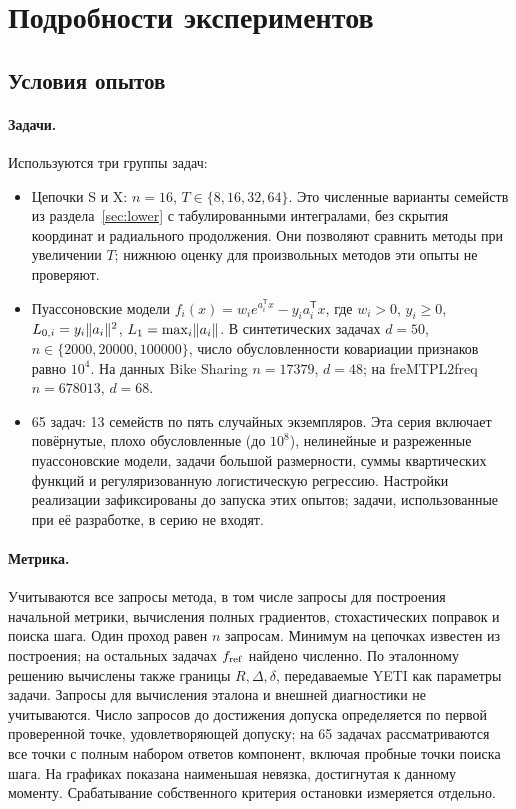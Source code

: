 \clearpage
\section{Подробности экспериментов}\label{app:experiments}

\subsection{Условия опытов}\label{sec:exp-protocol}

\paragraph{Задачи.}
Используются три группы задач:
\begin{itemize}
\item Цепочки S и X: $n=16$, $T\in\{8,16,32,64\}$.
Это численные варианты семейств из раздела~\ref{sec:lower}
с табулированными интегралами, без скрытия координат и радиального
продолжения. Они позволяют сравнить методы при увеличении $T$;
нижнюю оценку для произвольных методов эти опыты не проверяют.
\item Пуассоновские модели $f_i(x)=w_i e^{a_i^{\mathsf T}x}-y_i a_i^{\mathsf T}x$,
где $w_i>0$, $y_i\ge0$, $L_{0,i}=y_i\lVert a_i\rVert^2$,
$L_1=\max_i\lVert a_i\rVert$.
В синтетических задачах $d=50$, $n\in\{2000,20000,100000\}$,
число обусловленности ковариации признаков равно $10^4$.
На данных Bike Sharing $n=17379$, $d=48$;
на freMTPL2freq $n=678013$, $d=68$.
\item 65 задач: 13 семейств по пять случайных экземпляров.
Эта серия включает повёрнутые, плохо обусловленные (до $10^8$),
нелинейные и разреженные пуассоновские модели, задачи большой размерности,
суммы квартических функций и регуляризованную логистическую регрессию.
Настройки реализации зафиксированы до запуска этих опытов;
задачи, использованные при её разработке, в серию не входят.
\end{itemize}

\paragraph{Метрика.}
Учитываются все запросы метода, в том числе запросы для построения
начальной метрики, вычисления полных градиентов, стохастических поправок
и поиска шага.
Один проход равен $n$ запросам.
Минимум на цепочках известен из построения; на остальных задачах
$f_{\rm ref}$ найдено численно. По эталонному решению вычислены также
границы $R,\Delta,\delta$, передаваемые YETI как параметры задачи.
Запросы для вычисления эталона и внешней диагностики не учитываются.
Число запросов до достижения допуска определяется по первой проверенной
точке, удовлетворяющей допуску; на 65 задачах рассматриваются все точки
с полным набором ответов компонент, включая пробные точки поиска шага.
На графиках показана наименьшая невязка, достигнутая к данному моменту.
Срабатывание собственного критерия остановки измеряется отдельно.

